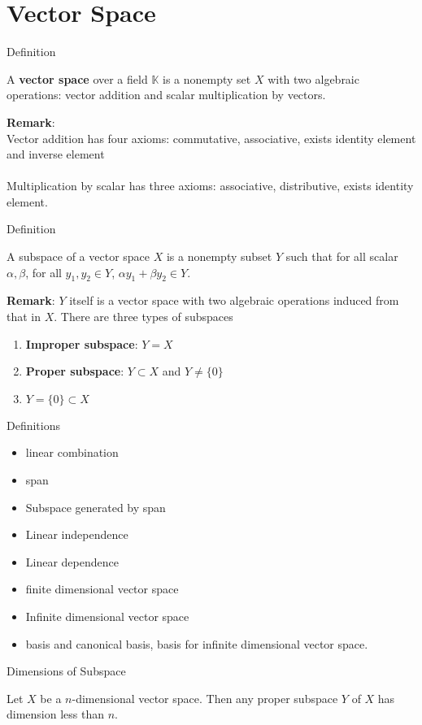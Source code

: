 \section{Vector Space}

\begin{frame}{Definition}
\begin{definition}
    A \textbf{vector space} over a field $\mathbb{K}$ is a nonempty set $X$ with two algebraic operations: vector addition and scalar multiplication by vectors.
\end{definition}
    \textbf{Remark}:\\
    Vector addition has four axioms: commutative, associative, exists identity element and inverse element\\
    \\
    Multiplication by scalar has three axioms: associative, distributive, exists identity element. 
\end{frame}

\begin{frame}{Definition}
    \begin{definition}
        A subspace of a vector space $X$ is a nonempty subset $Y$ such that for all scalar $\alpha,\beta$, for all $y_1,y_2\in Y$, $\alpha y_1+\beta y_2\in Y$. 
    \end{definition}
    \textbf{Remark}: $Y$ itself is a vector space with two algebraic operations induced from that in $X$. There are three types of subspaces
    \begin{enumerate}
        \item \textbf{Improper subspace}: $Y=X$
        \item \textbf{Proper subspace}: $Y\subset X$ and $Y\neq\{0\}$
        \item $Y=\{0\}\subset X$
    \end{enumerate}
\end{frame}

\begin{frame}{Definitions}
    \begin{definition}
    \begin{itemize}
        \item linear combination
        \item span
        \item Subspace generated by span
        \item Linear independence
        \item Linear dependence
        \item finite dimensional vector space
        \item Infinite dimensional vector space
        \item basis and canonical basis, basis for infinite dimensional vector space. 
    \end{itemize}
\end{definition}
\end{frame}

\begin{frame}{Dimensions of Subspace}
\begin{theorem}
    Let $X$ be a $n$-dimensional vector space. Then any proper subspace $Y$ of $X$ has dimension less than $n$.
\end{theorem}
    
\end{frame}


